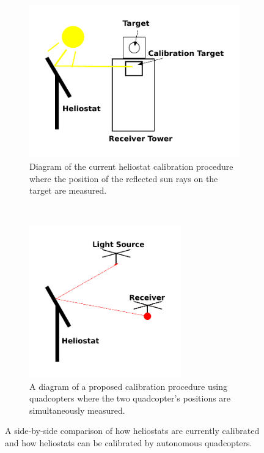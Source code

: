 \begin{figure}
  \centering
  \begin{subfigure}{0.48\textwidth}
    \centering
    \includegraphics[width=\textwidth]{figures/chapter1/cur_proc.pdf}
    \caption{Diagram of the current heliostat calibration procedure where the position of the reflected sun rays on the target are measured.}
\label{fig:cur-calib-proc}
  \end{subfigure}%
~
  \begin{subfigure}{0.48\textwidth}
    \centering
    \includegraphics[width=0.72\textwidth]{figures/chapter1/drone_proc.pdf}
    \caption{A diagram of a proposed calibration procedure using quadcopters where the two quadcopter's positions are simultaneously measured.}
\label{fig:drone-calib-proc}
  \end{subfigure}
  \caption{A side-by-side comparison of how heliostats are currently calibrated and how heliostats can be calibrated by autonomous quadcopters.}
\label{fig:calib-diagrams}
\end{figure}

